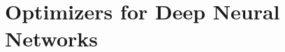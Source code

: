 \documentclass[handout,xcolor=pdftex,dvipsnames,table,mathserif]{beamer}
\begin{document}
%
%

\section{Optimizers for Deep Neural Networks}
\end{document}
